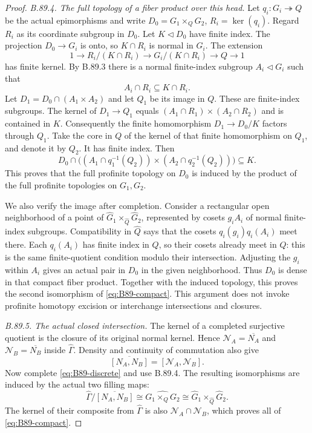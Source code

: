 \begin{proof}
\emph{B.89.4. The full topology of a fiber product over this head.}
Let $q_i:G_i\twoheadrightarrow Q$ be the actual epimorphisms and
write $D_0=G_1\times_QG_2$, $R_i=\ker(q_i)$. Regard $R_i$ as
its coordinate subgroup in $D_0$. Let $K\triangleleft D_0$ have
finite index. The projection $D_0\to G_i$ is onto, so
$K\cap R_i$ is normal in $G_i$. The extension
\[
 1\longrightarrow R_i/(K\cap R_i)
  \longrightarrow G_i/(K\cap R_i)
  \longrightarrow Q\longrightarrow1
\]
has finite kernel. By B.89.3 there is a normal finite-index subgroup
$A_i\triangleleft G_i$ such that
\begin{equation}\label{eq:B89-coordinate-separation}
 A_i\cap R_i\subseteq K\cap R_i.
\end{equation}
Let $D_1=D_0\cap(A_1\times A_2)$ and let $Q_1$ be its image
in $Q$. These are finite-index subgroups. The kernel of
$D_1\to Q_1$ equals
$(A_1\cap R_1)\times(A_2\cap R_2)$ and is contained in $K$.
Consequently the finite homomorphism $D_1\to D_0/K$ factors
through $Q_1$. Take the core in $Q$ of the kernel of that finite
homomorphism on $Q_1$, and denote it by $Q_2$. It has finite index.
Then
\[
 D_0\cap\bigl((A_1\cap q_1^{-1}(Q_2))
                    \times(A_2\cap q_2^{-1}(Q_2))\bigr)\subseteq K.
\]
This proves that the full profinite topology on $D_0$ is induced
by the product of the full profinite topologies on $G_1,G_2$.

We also verify the image after completion. Consider a rectangular
open neighborhood of a point of
$\widehat G_1\times_{\widehat Q}\widehat G_2$, represented by
cosets $g_i A_i$ of normal finite-index subgroups. Compatibility
in $\widehat Q$ says that the cosets
$q_i(g_i)q_i(A_i)$ meet there. Each $q_i(A_i)$ has finite index
in $Q$, so their cosets already meet in $Q$: this is the same
finite-quotient condition modulo their intersection. Adjusting
the $g_i$ within $A_i$ gives an actual pair in $D_0$ in the given
neighborhood. Thus $D_0$ is dense in that compact fiber product.
Together with the induced topology, this proves the second
isomorphism of \eqref{eq:B89-compact}. This argument does not
invoke profinite homotopy excision or interchange intersections
and closures.

\emph{B.89.5. The actual closed intersection.}
The kernel of a completed surjective quotient is the closure of
its original normal kernel. Hence
$\mathcal N_A=\overline{N_A}$ and
$\mathcal N_B=\overline{N_B}$ inside $\widehat\Gamma$.
Density and continuity of commutation also give
\[
 \overline{[N_A,N_B]}=[\mathcal N_A,\mathcal N_B].
\]
Now complete \eqref{eq:B89-discrete} and use B.89.4. The resulting
isomorphisms are induced by the actual two filling maps:
\[
 \widehat\Gamma/\overline{[N_A,N_B]}
   \cong\widehat{G_1\times_QG_2}
   \cong\widehat G_1\times_{\widehat Q}\widehat G_2.
\]
The kernel of their composite from $\widehat\Gamma$ is also
$\mathcal N_A\cap\mathcal N_B$, which proves all of
\eqref{eq:B89-compact}.


\end{proof}
